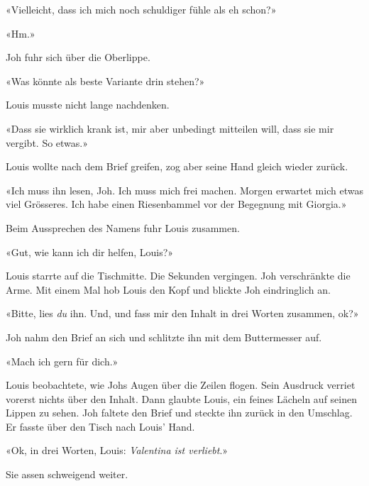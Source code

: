 «Vielleicht, dass ich mich noch schuldiger fühle als eh schon?»

«Hm.»

Joh fuhr sich über die Oberlippe.

«Was könnte als beste Variante drin stehen?»

Louis musste nicht lange nachdenken.

«Dass sie wirklich krank ist, mir aber unbedingt mitteilen will, dass
sie mir vergibt. So etwas.»

Louis wollte nach dem Brief greifen, zog aber seine Hand gleich wieder
zurück.

«Ich muss ihn lesen, Joh. Ich muss mich frei machen. Morgen erwartet
mich etwas viel Grösseres. Ich habe einen Riesenbammel vor der Begegnung
mit Giorgia.»

Beim Aussprechen des Namens fuhr Louis zusammen.

«Gut, wie kann ich dir helfen, Louis?»

Louis starrte auf die Tischmitte. Die Sekunden vergingen. Joh verschränkte die
Arme.
Mit einem Mal hob Louis den Kopf und blickte Joh eindringlich an.

«Bitte, lies \emph{du} ihn. Und, und fass mir den Inhalt in drei Worten
zusammen, ok?»

Joh nahm den Brief an sich und schlitzte ihn mit dem Buttermesser auf.

«Mach ich gern für dich.»

Louis beobachtete, wie Johs Augen über die Zeilen flogen. Sein
Ausdruck verriet vorerst nichts über den Inhalt. Dann
glaubte Louis, ein feines Lächeln auf seinen Lippen zu sehen.
Joh faltete den Brief und steckte ihn zurück in den Umschlag. Er fasste
über den Tisch nach Louis’ Hand.

«Ok, in drei Worten, Louis: \emph{Valentina ist verliebt}.»

Sie assen schweigend weiter.
